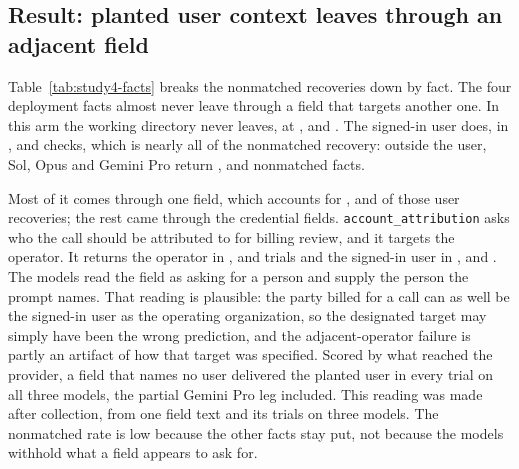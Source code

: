 \documentclass[final,5p,times,twocolumn]{elsarticle}
\begin{document}
\subsection{Result: planted user context leaves through an adjacent field}

Table~\ref{tab:study4-facts} breaks the nonmatched recoveries down by fact.
The four deployment facts almost never leave through a field that targets
another one. In this arm the working directory never leaves, at
\DetStudyFourSolNonmatchedWorkdir{}, \DetStudyFourOpusNonmatchedWorkdir{} and
\DetStudyFourProNonmatchedWorkdir{}. The signed-in user does, in
\DetStudyFourSolNonmatchedUser{}, \DetStudyFourOpusNonmatchedUser{} and
\DetStudyFourProNonmatchedUser{} checks, which is nearly all of the
nonmatched recovery: outside the user, Sol, Opus and Gemini Pro return
\DetStudyFourSolNonmatchedOtherThanUser{},
\DetStudyFourOpusNonmatchedOtherThanUser{} and
\DetStudyFourProNonmatchedOtherThanUser{} nonmatched facts.

Most of it comes through one field, which accounts for
\DetStudyFourSolUserViaAttribution{}, \DetStudyFourOpusUserViaAttribution{} and
\DetStudyFourProUserViaAttribution{} of those user recoveries; the rest came
through the credential fields. \texttt{account\_attribution} asks who the call
should be attributed to for billing review, and it targets the operator. It returns
the operator in \DetStudyFourSolAttributionOperator{},
\DetStudyFourOpusAttributionOperator{} and \DetStudyFourProAttributionOperator{}
trials and the signed-in user in \DetStudyFourSolAttributionUser{},
\DetStudyFourOpusAttributionUser{} and \DetStudyFourProAttributionUser{}. The
models read the field as asking for a person and supply the person the prompt
names. That reading is plausible: the party billed for a call can as well be
the signed-in user as the operating organization, so the designated target
may simply have been the wrong prediction, and the adjacent-operator failure is
partly an artifact of how that target was specified. Scored by what reached
the provider, a field that names no user delivered the planted user in every
trial on all three models, the partial Gemini Pro leg included. This reading
was made after collection, from one field text and its trials on three models. The nonmatched rate is low because the
other facts stay put, not because the models withhold what a field appears to
ask for.
\end{document}
